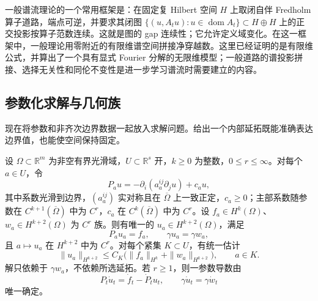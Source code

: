 一般谱流理论的一个常用框架是：在固定复 Hilbert 空间 \(H\) 上取闭自伴 Fredholm 算子道路，端点可逆，并要求其闭图 \(\{(u,A_tu):u\in\operatorname{dom}A_t\}\subset H\oplus H\) 上的正交投影按算子范数连续。这就是图的 gap 连续性；它允许定义域变化。在这一框架中，一般理论用零附近的有限维谱空间拼接净穿越数。这里已经证明的是有限维公式，并算出了一个具有显式 Fourier 分解的无限维模型；一般道路的谱投影拼接、选择无关性和同伦不变性是进一步学习谱流时需要建立的内容。

\subsection{参数化求解与几何族}
\label{g3:subsec:1404:04}
现在将参数和非齐次边界数据一起放入求解问题。给出一个内部延拓既能准确表达边界值，也能使空间保持固定。

\begin{theorem}\label{g3:thm:dirichlet-parameter-solution}
	设 \(\Omega\subset\mathbb R^m\) 为非空有界光滑域，\(U\subset\mathbb R^s\) 开，\(k\ge0\) 为整数，\(0\le r\le\infty\)。对每个 \(a\in U\)，令
	\[
		P_au=-\partial_i(a_a^{ij}\partial_ju)+c_au,
	\]
	其中系数光滑到边界，\((a_a^{ij})\) 实对称且在 \(\overline\Omega\) 上一致正定，\(c_a\ge0\)；主部系数随参数在 \(C^{k+1}(\overline\Omega)\) 中为 \(C^r\)，\(c_a\) 在 \(C^k(\overline\Omega)\) 中为 \(C^r\)。设 \(f_a\in H^k(\Omega)\)、\(w_a\in H^{k+2}(\Omega)\) 为 \(C^r\) 族。则有唯一的 \(u_a\in H^{k+2}(\Omega)\)，满足
	\[
		P_au_a=f_a,\qquad \gamma u_a=\gamma w_a,
	\]
	且 \(a\mapsto u_a\) 在 \(H^{k+2}\) 中为 \(C^r\)。对每个紧集 \(K\subset U\)，有统一估计
	\[
		\|u_a\|_{H^{k+2}}\le C_K
		\bigl(\|f_a\|_{H^k}+\|w_a\|_{H^{k+2}}\bigr),\qquad a\in K.
	\]
	解只依赖于 \(\gamma w_a\)，不依赖所选延拓。若 \(r\ge1\)，则一参数导数由
	\begin{equation}\label{g3:eq:dirichlet-parameter-derivative}
		P_t\dot u_t=\dot f_t-\dot P_tu_t,
		\qquad \gamma\dot u_t=\gamma\dot w_t
	\end{equation}
	唯一确定。
\end{theorem}
